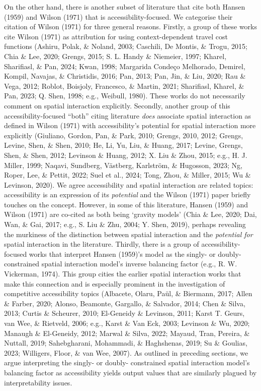 \documentclass[
11pt, %
oneside, %
english, %
singlespacing, %
]{macthesis} %
\begin{document}
On the other hand, there is another subset of literature that cite both Hansen (1959) and Wilson (1971) that is accessibility-focused. We categorise their citation of Wilson (1971) for three general reasons. Firstly, a group of these works cite Wilson (1971) as attribution for using context-dependent travel cost functions (Ashiru, Polak, \& Noland, 2003; Caschili, De Montis, \& Trogu, 2015; Chia \& Lee, 2020; Grengs, 2015; S. L. Handy \& Niemeier, 1997; Kharel, Sharifiasl, \& Pan, 2024; Kwan, 1998; Margarida Condeço Melhorado, Demirel, Kompil, Navajas, \& Christidis, 2016; Pan, 2013; Pan, Jin, \& Liu, 2020; Rau \& Vega, 2012; Roblot, Boisjoly, Francesco, \& Martin, 2021; Sharifiasl, Kharel, \& Pan, 2023; Q. Shen, 1998; e.g., Weibull, 1980). These works do not necessarily comment on spatial interaction explicitly. Secondly, another group of this accessibility-focused ``both'' citing literature \emph{does} associate spatial interaction as defined in Wilson (1971) with accessibility's potential for spatial interaction more explicitly (Giuliano, Gordon, Pan, \& Park, 2010; Grengs, 2010, 2012; Grengs, Levine, Shen, \& Shen, 2010; He, Li, Yu, Liu, \& Huang, 2017; Levine, Grengs, Shen, \& Shen, 2012; Levinson \& Huang, 2012; X. Liu \& Zhou, 2015; e.g., H. J. Miller, 1999; Naqavi, Sundberg, Västberg, Karlström, \& Hugosson, 2023; Ng, Roper, Lee, \& Pettit, 2022; Suel et al., 2024; Tong, Zhou, \& Miller, 2015; Wu \& Levinson, 2020). We agree accessibility and spatial interaction are related topics: accessibility is an expression of its \emph{potential} and the Wilson (1971) paper briefly touches on the concept. However, in some of this literature, Hansen (1959) and Wilson (1971) are co-cited as both being `gravity models' (Chia \& Lee, 2020; Dai, Wan, \& Gai, 2017; e.g., S. Liu \& Zhu, 2004; Y. Shen, 2019), perhaps revealing the murkiness of the distinction between spatial interaction and the \emph{potential for} spatial interaction in the literature. Thirdly, there is a group of accessibility-focused works that interpret Hansen (1959)'s model as the singly- or doubly- constrained spatial interaction model's inverse balancing factor (e.g., R. W. Vickerman, 1974). This group cities the earlier spatial interaction works that make this connection and is especially prominent in the investigation of competitive accessibility topics (Albacete, Olaru, Paül, \& Biermann, 2017; Allen \& Farber, 2020; Alonso, Beamonte, Gargallo, \& Salvador, 2014; Chen \& Silva, 2013; Curtis \& Scheurer, 2010; El-Geneidy \& Levinson, 2011; Karst T. Geurs, van Wee, \& Rietveld, 2006; e.g., Karst \& Van Eck, 2003; Levinson \& Wu, 2020; Manaugh \& El-Geneidy, 2012; Marwal \& Silva, 2022; Mayaud, Tran, Pereira, \& Nuttall, 2019; Sahebgharani, Mohammadi, \& Haghshenas, 2019; Su \& Goulias, 2023; Willigers, Floor, \& van Wee, 2007). As outlined in preceding sections, we argue interpreting the singly- or doubly- constrained spatial interaction model's balancing factor as accessibility yields output values that are similarly plagued by interpretability issues.
\end{document}
